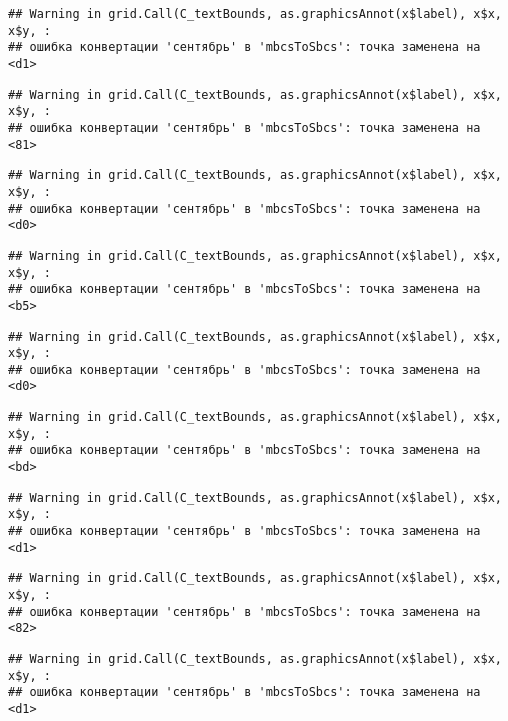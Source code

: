 \documentclass[
]{article}
\begin{document}
\begin{verbatim}
## Warning in grid.Call(C_textBounds, as.graphicsAnnot(x$label), x$x, x$y, :
## ошибка конвертации 'сентябрь' в 'mbcsToSbcs': точка заменена на <d1>
\end{verbatim}

\begin{verbatim}
## Warning in grid.Call(C_textBounds, as.graphicsAnnot(x$label), x$x, x$y, :
## ошибка конвертации 'сентябрь' в 'mbcsToSbcs': точка заменена на <81>
\end{verbatim}

\begin{verbatim}
## Warning in grid.Call(C_textBounds, as.graphicsAnnot(x$label), x$x, x$y, :
## ошибка конвертации 'сентябрь' в 'mbcsToSbcs': точка заменена на <d0>
\end{verbatim}

\begin{verbatim}
## Warning in grid.Call(C_textBounds, as.graphicsAnnot(x$label), x$x, x$y, :
## ошибка конвертации 'сентябрь' в 'mbcsToSbcs': точка заменена на <b5>
\end{verbatim}

\begin{verbatim}
## Warning in grid.Call(C_textBounds, as.graphicsAnnot(x$label), x$x, x$y, :
## ошибка конвертации 'сентябрь' в 'mbcsToSbcs': точка заменена на <d0>
\end{verbatim}

\begin{verbatim}
## Warning in grid.Call(C_textBounds, as.graphicsAnnot(x$label), x$x, x$y, :
## ошибка конвертации 'сентябрь' в 'mbcsToSbcs': точка заменена на <bd>
\end{verbatim}

\begin{verbatim}
## Warning in grid.Call(C_textBounds, as.graphicsAnnot(x$label), x$x, x$y, :
## ошибка конвертации 'сентябрь' в 'mbcsToSbcs': точка заменена на <d1>
\end{verbatim}

\begin{verbatim}
## Warning in grid.Call(C_textBounds, as.graphicsAnnot(x$label), x$x, x$y, :
## ошибка конвертации 'сентябрь' в 'mbcsToSbcs': точка заменена на <82>
\end{verbatim}

\begin{verbatim}
## Warning in grid.Call(C_textBounds, as.graphicsAnnot(x$label), x$x, x$y, :
## ошибка конвертации 'сентябрь' в 'mbcsToSbcs': точка заменена на <d1>
\end{verbatim}
\end{document}
